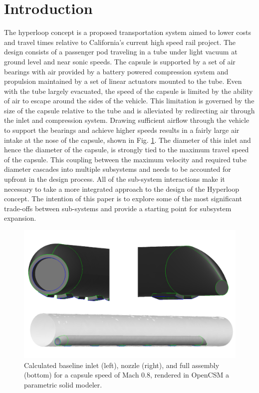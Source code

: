\documentclass[heading.tex]{subfiles}
\begin{document}
\section{Introduction}


The hyperloop concept is a proposed transportation system aimed to lower costs and travel times relative to California's current high speed
 rail project. \cite{Musk} The design consists of a passenger pod traveling in a tube under light vacuum at ground level and near sonic
speeds. The capsule is supported by a set of air bearings with air provided by a battery powered compression system and propulsion maintained
by a set of linear actuators mounted to the tube. Even with the tube largely evacuated, the speed of the capsule is limited by the ability of air to
escape around the sides of the vehicle. This limitation is governed by the size of the capsule relative to the tube and is alleviated by redirecting air
through the inlet and compression system. Drawing sufficient airflow through the vehicle to support the bearings and achieve higher speeds results
in a fairly large air intake at the nose of the capsule, shown in Fig. \ref{f:hyperloopCAD}. The diameter of this inlet and hence the diameter of the
capsule, is strongly tied to the maximum travel speed of the capsule. This coupling between the maximum velocity and
required tube diameter cascades into multiple subsystems and needs to be accounted for upfront in the design process. 
All of the sub-system interactions make it necessary to take a more integrated approach to the design of the Hyperloop concept. The intention of
this paper is to explore some of the most significant trade-offs between sub-systems and provide a starting point for subsystem expansion.

\begin{figure}[hbtp]
\centering
\includegraphics[scale=0.25]{images/hyperloop_cad.png}
\caption{Calculated baseline inlet (left), nozzle (right), and full assembly (bottom) for a capsule speed of Mach 0.8, rendered in OpenCSM a parametric solid modeler.}
\label{f:hyperloopCAD}
\end{figure}
\end{document}
